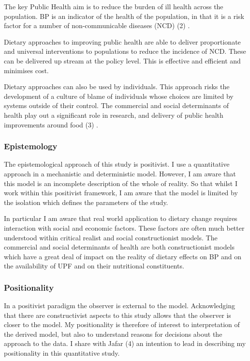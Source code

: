 \documentclass[
]{article}
\begin{document}
The key Public Health aim is to reduce the burden of ill health across
the population. BP is an indicator of the health of the population, in
that it is a risk factor for a number of non-communicable diseases (NCD)
(2) .

Dietary approaches to improving public health are able to deliver
proportionate and universal interventions to populations to reduce the
incidence of NCD. These can be delivered up stream at the policy level.
This is effective and efficient and minimises cost.

Dietary approaches can also be used by individuals. This approach risks
the development of a culture of blame of individuals whose choices are
limited by systems outside of their control. The commercial and social
determinants of health play out a significant role in research, and
delivery of public health improvements around food (3) .

\hypertarget{epistemology}{%
\subsubsection{Epistemology}\label{epistemology}}

The epistemological approach of this study is positivist. I use a
quantitative approach in a mechanistic and deterministic model. However,
I am aware that this model is an incomplete description of the whole of
reality. So that whilst I work within this positivist framework, I am
aware that the model is limited by the isolation which defines the
parameters of the study.

In particular I am aware that real world application to dietary change
requires interaction with social and economic factors. These factors are
often much better understood within critical realist and social
constructionist models. The commercial and social determinants of health
are both constructionist models which have a great deal of impact on the
reality of dietary effects on BP and on the availability of UPF and on
their nutritional constituents.

\hypertarget{positionality}{%
\subsubsection{Positionality}\label{positionality}}

In a positivist paradigm the observer is external to the model.
Acknowledging that there are constructivist aspects to this study allows
that the observer is closer to the model. My positionality is therefore
of interest to interpretation of the derived model, but also to
understand reasons for decisions about the approach to the data. I share
with Jafar (4) an intention to lead in describing my positionality in
this quantitative study.
\end{document}
